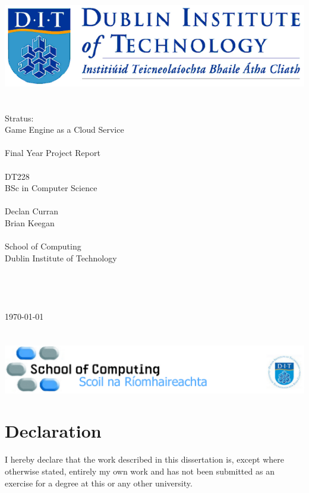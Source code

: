\documentclass[a4paper, 12pt]{report}
\begin{document}
\begin{titlingpage}
	\centering
	\includegraphics[scale=0.5]{titleheader}\\
	~\\
	~\\
	\huge
	Stratus:\\
	Game Engine as a Cloud Service\\
	~\\
	Final Year Project Report\\
	~\\
	\LARGE
	DT228\\
	BSc in Computer Science\\
	~\\
	\large
	Declan Curran\\
	\normalsize
	Brian Keegan\\
	~\\
	School of Computing\\
	Dublin Institute of Technology\\
	~\\
	~\\
	~\\
	~\\
	\today
	~\\
	~\\
	~\\
	\includegraphics[scale=0.5]{titlefooter}
\end{titlingpage}


\chapter*{Declaration}
I hereby declare that the work described in this dissertation is, except where otherwise stated, entirely my own work and has not been submitted as an exercise for a degree at this or any other university.
\end{document}
